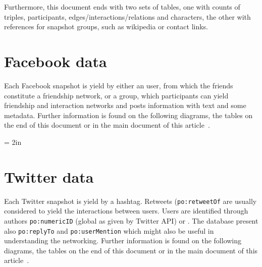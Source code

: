 \documentclass[review]{elsarticle}
\newcommand{\textttt}[1] {\texttt{\footnotesize#1}}
\begin{document}
Furthermore, this document ends with two sets of tables, one with counts of
triples, participants, edges/interactions/relations and characters,
the other with references for snapshot groups, such as wikipedia or
contact links.


\section{Facebook data}
Each Facebook snapshot is yield by either an user, from which the
friends constitute a friendship network, or a group, which participants
can yield friendship and interaction networks and posts information with
text and some metadata.
Further information is found on the following diagrams, the tables on
the end of this document or in the main document of this
article~\cite{losd}.

% 

\textheight = 2in
\pdfpageheight 5in

\section{Twitter data}
Each Twitter snapshot is yield by a hashtag.
Retweets (\textttt{po:retweetOf} are usually considered to yield the interactions between users.
Users are identified through authors \textttt{po:numericID} (global as given by Twitter API)
or \textttt{}.
The database present also \textttt{po:replyTo} and \textttt{po:userMention}
which might also be useful in understanding the networking.
Further information is found on the following diagrams, the tables on
the end of this document or in the main document of this
article~\cite{losd}.


\end{document}
